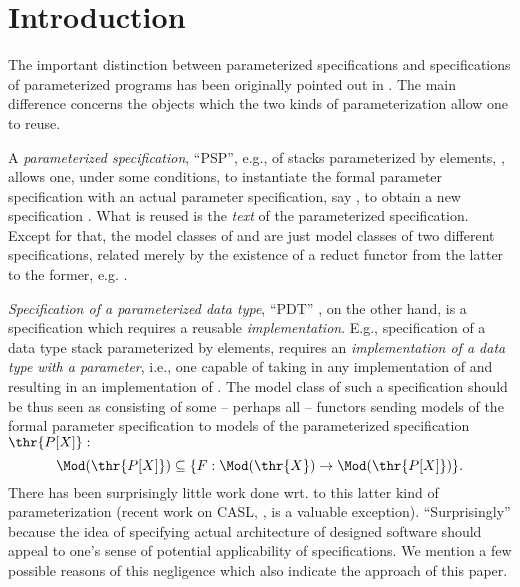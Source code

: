 \section{Introduction}
The important distinction between parameterized specifications and specifications
of parameterized programs has been originally pointed out in \cite{ST}. The
main difference concerns the objects which the two kinds of parameterization
allow one to reuse. 

A {\em parameterized specification}, ``PSP'', e.g., of stacks parameterized
by elements, , allows
one, under some conditions, to instantiate
the formal parameter specification  with an actual parameter specification, say , to
obtain a new specification . What is reused is the {\em text} of
the parameterized specification. Except for that, the model classes of 
and  are just model
classes of two different specifications, related merely by the existence of a
reduct functor from the latter to the former, 
e.g. \cite{BG,Alge}.

{\em Specification of a parameterized data type}, ``PDT'' \cite{ST,para}, on the other hand, is a
specification which requires a reusable {\em implementation}. E.g.,
specification of a data type stack parameterized by elements, 
requires an {\em implementation of a data type with a parameter}, i.e., one capable
of taking in any implementation of  and resulting in an implementation of
. The model class of such a specification should be thus seen as
consisting of some -- perhaps all -- functors sending models of the formal
parameter specification  to models of the parameterized specification $\thr{P[X]}:$
\begin{equation}
\Mod(\thr{P[X]}) \subseteq \{F:\Mod(\thr{X})\to\Mod(\thr{P[X]})\}. \label{eq:fsem}
\end{equation}
There has been surprisingly little work done wrt. to this latter kind of
parameterization (recent work on CASL, \cite{CASL}, is a valuable exception). ``Surprisingly'' because the idea of specifying actual
architecture of designed software should appeal to one's sense of potential
applicability of specifications. 
We mention a few possible reasons of this negligence which also indicate the
approach of this paper.

